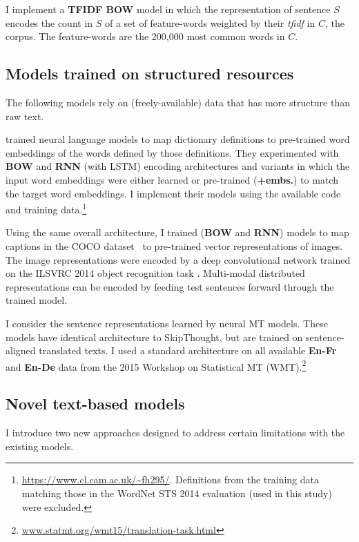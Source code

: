 \vspace{5pt} I implement a {\bf TFIDF BOW} model in which the representation of sentence \(S\) encodes the count in \(S\) of a set of feature-words weighted by their \emph{tfidf} in \(C\), the corpus. The feature-words are the 200,000 most common words in \(C\). 

\subsection{Models trained on structured resources}
The following models rely on (freely-available) data that has more structure than raw text.

\vspace{5pt} \cite{hill2015learning} trained neural language models to map dictionary definitions to pre-trained word embeddings of the words defined by those definitions. They experimented with {\bf BOW} and {\bf RNN} (with LSTM) encoding architectures and variants in which the input word embeddings were either learned or pre-trained ({\bf+embs.}) to match the target word embeddings. I implement their models using the available code and training data.\footnote{{\scriptsize \url{https://www.cl.cam.ac.uk/~fh295/}}. Definitions from the training data matching those in the WordNet STS 2014 evaluation (used in this study) were excluded.}

\vspace{5pt} Using the same overall architecture, I trained ({\bf BOW} and {\bf RNN}) models to map captions in the COCO dataset~\citep{chen2015microsoft} to pre-trained vector representations of images. The image representations were encoded by a deep convolutional network \citep{szegedy2014going} trained on the ILSVRC 2014 object recognition task \citep{russakovsky2014imagenet}. Multi-modal distributed representations can be encoded by feeding test sentences forward through the trained model. 

\vspace{5pt} I consider the sentence representations learned by neural MT models. These models have identical architecture to SkipThought, but are trained on sentence-aligned translated texts. I used a standard architecture \citep{cho2014learning} on all available {\bf En-Fr} and {\bf En-De} data from the 2015 Workshop on Statistical MT (WMT).\footnote{\scriptsize \url{www.statmt.org/wmt15/translation-task.html}} 

\subsection{Novel text-based models}
I introduce two new approaches designed to address certain limitations with the existing models.

